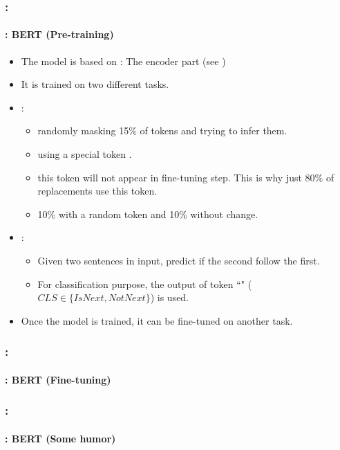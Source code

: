 \documentclass[xcolor=table]{beamer}
\begin{document}
\begin{frame}
	\frametitle{\insertshortsubtitle: \insertsection}
	\framesubtitle{\insertsubsection: BERT (Pre-training)}
	
	\begin{itemize}
		\item The model is based on : The encoder part (see \cite{2017-vaswani-al})
		\item It is trained on two different tasks.
		\item {}:
		\begin{itemize}
			\item randomly masking 15\% of tokens and trying to infer them.
			\item using a special token \keyword{[MASK]}.
			\item this token will not appear in fine-tuning step.
			This is why just 80\% of replacements use this token.
			\item 10\% with a random token and 10\% without change. 
		\end{itemize}
		\item {}:
		\begin{itemize}
			\item Given two sentences in input, predict if the second follow the first. 
			\item For classification purpose, the output of token ``\keyword{[CLS]}" ($CLS \in \{IsNext, NotNext\}$) is used.
		\end{itemize}
		\item Once the model is trained, it can be fine-tuned on another task.
	\end{itemize}
	
\end{frame}

\begin{frame}
	\frametitle{\insertshortsubtitle: \insertsection}
	\framesubtitle{\insertsubsection: BERT (Fine-tuning)}

	\begin{center}
	\end{center}
	
\end{frame}

\begin{frame}
	\frametitle{\insertshortsubtitle: \insertsection}
	\framesubtitle{\insertsubsection: BERT (Some humor)}

	\begin{center}
	\end{center}
	
\end{frame}
\end{document}
